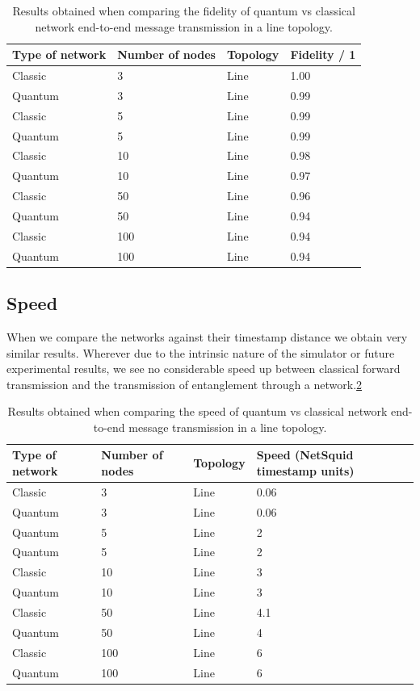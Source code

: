 \documentclass{article}
\begin{document}
    \begin{table}[!h] 
    \caption{Results obtained when comparing the fidelity of quantum vs classical network end-to-end message transmission in a line topology.}
    \label{table_fidelity} 
    \centering 
    \begin{tabular}{|l || l|  l| l|} 
    \hline 
    Type of network & Number of nodes & Topology & Fidelity / 1 \\
    \hline 
    Classic & 3 & Line & 1.00\\ 
    Quantum & 3 & Line & 0.99\\ 
    Classic & 5 & Line & 0.99\\ 
    Quantum & 5 & Line & 0.99\\ 
    Classic & 10 & Line & 0.98\\ 
    Quantum & 10 & Line & 0.97\\ 
    Classic & 50 & Line & 0.96\\ 
    Quantum & 50 & Line & 0.94\\    
    Classic & 100 & Line & 0.94\\ 
    Quantum & 100 & Line & 0.94\\
    \hline 
    \end{tabular} 
    \end{table} 
    
    \subsection*{Speed}
    When we compare the networks against their timestamp distance we obtain very similar results. Wherever due to the intrinsic nature of the simulator or future experimental results, we see no considerable speed up between classical forward transmission and the transmission of entanglement through a network.\ref{table_speed} 
    
    \begin{table}[!h] 
    \caption{Results obtained when comparing the speed of quantum vs classical network end-to-end message transmission in a line topology.}
    \label{table_speed} 
    \centering 
    \begin{tabular}{|l || l|  l| l|}  
    \hline 
    Type of network & Number of nodes & Topology & Speed (NetSquid timestamp units)  \\
    \hline 
    Classic & 3 & Line & 0.06\\ 
    Quantum & 3 & Line & 0.06 \\
    Quantum & 5 & Line & 2\\ 
    Quantum & 5 & Line & 2\\ 
    Classic & 10 & Line & 3\\ 
    Quantum & 10 & Line & 3\\ 
    Classic & 50 & Line & 4.1\\ 
    Quantum & 50 & Line & 4\\    
    Classic & 100 & Line & 6\\ 
    Quantum & 100 & Line & 6\\
    \hline 
    \end{tabular} 
    \end{table} 
\end{document}
